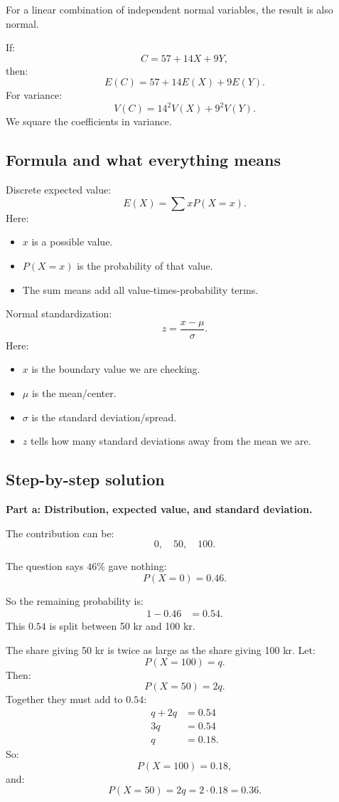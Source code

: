 \documentclass[11pt,a4paper]{article}
\begin{document}
For a linear combination of independent normal variables, the result is also normal.

If:
\[
C=57+14X+9Y,
\]
then:
\[
E(C)=57+14E(X)+9E(Y).
\]
For variance:
\[
V(C)=14^2V(X)+9^2V(Y).
\]
We square the coefficients in variance.

\subsection*{Formula and what everything means}
Discrete expected value:
\[
E(X)=\sum xP(X=x).
\]
Here:
\begin{itemize}[leftmargin=*]
    \item \(x\) is a possible value.
    \item \(P(X=x)\) is the probability of that value.
    \item The sum means add all value-times-probability terms.
\end{itemize}

Normal standardization:
\[
z=\frac{x-\mu}{\sigma}.
\]
Here:
\begin{itemize}[leftmargin=*]
    \item \(x\) is the boundary value we are checking.
    \item \(\mu\) is the mean/center.
    \item \(\sigma\) is the standard deviation/spread.
    \item \(z\) tells how many standard deviations away from the mean we are.
\end{itemize}

\subsection*{Step-by-step solution}
\textbf{Part a: Distribution, expected value, and standard deviation.}

The contribution can be:
\[
0,\quad 50,\quad 100.
\]

The question says \(46\%\) gave nothing:
\[
P(X=0)=0.46.
\]

So the remaining probability is:
\begin{align*}
1-0.46&=0.54.
\end{align*}
This \(0.54\) is split between 50 kr and 100 kr.

The share giving 50 kr is twice as large as the share giving 100 kr. Let:
\[
P(X=100)=q.
\]
Then:
\[
P(X=50)=2q.
\]
Together they must add to \(0.54\):
\begin{align*}
q+2q&=0.54\\
3q&=0.54\\
q&=0.18.
\end{align*}
So:
\[
P(X=100)=0.18,
\]
and:
\[
P(X=50)=2q=2\cdot 0.18=0.36.
\]
\end{document}
